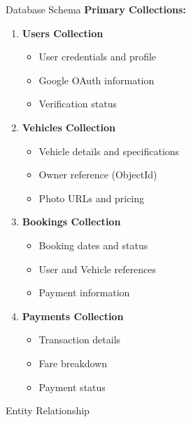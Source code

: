 \begin{frame}{Database Schema}
\textbf{Primary Collections:}
\begin{enumerate}
    \item \textbf{Users Collection}
    \begin{itemize}
        \item User credentials and profile
        \item Google OAuth information
        \item Verification status
    \end{itemize}
    
    \item \textbf{Vehicles Collection}
    \begin{itemize}
        \item Vehicle details and specifications
        \item Owner reference (ObjectId)
        \item Photo URLs and pricing
    \end{itemize}
    
    \item \textbf{Bookings Collection}
    \begin{itemize}
        \item Booking dates and status
        \item User and Vehicle references
        \item Payment information
    \end{itemize}
    
    \item \textbf{Payments Collection}
    \begin{itemize}
        \item Transaction details
        \item Fare breakdown
        \item Payment status
    \end{itemize}
\end{enumerate}
\end{frame}

\begin{frame}{Entity Relationship}
\begin{center}
\end{center}
\end{frame}

